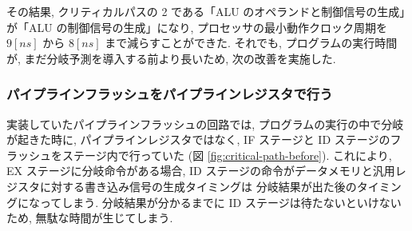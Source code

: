 \documentclass[../improvements.tex]{subfiles}
\begin{document}
  その結果, クリティカルパスの 2 である「ALU のオペランドと制御信号の生成」が「ALU の制御信号の生成」になり, 
  プロセッサの最小動作クロック周期を $9[ns]$ から $8[ns]$ まで減らすことができた.
  それでも, プログラムの実行時間が, まだ分岐予測を導入する前より長いため, 次の改善を実施した.

  \subsubsection{パイプラインフラッシュをパイプラインレジスタで行う} \label{subsubsection:rethink-flush}
  実装していたパイプラインフラッシュの回路では, 
  プログラムの実行の中で分岐が起きた時に, 
  パイプラインレジスタではなく, IF ステージと ID ステージのフラッシュをステージ内で行っていた (図 \ref{fig:critical-path-before}).
  これにより, EX ステージに分岐命令がある場合, 
  ID ステージの命令がデータメモリと汎用レジスタに対する書き込み信号の生成タイミングは
  分岐結果が出た後のタイミングになってしまう.
  分岐結果が分かるまでに ID ステージは待たないといけないため, 無駄な時間が生じてしまう.
\end{document}
